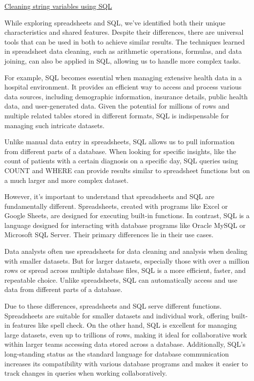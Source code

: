 \documentclass[]{article}
\begin{document}
\uline{Cleaning string variables using SQL}

While exploring spreadsheets and SQL, we've identified both their unique characteristics and shared features. Despite their differences, there are universal tools that can be used in both to achieve similar results. The techniques learned in spreadsheet data cleaning, such as arithmetic operations, formulas, and data joining, can also be applied in SQL, allowing us to handle more complex tasks.

For example, SQL becomes essential when managing extensive health data in a hospital environment. It provides an efficient way to access and process various data sources, including demographic information, insurance details, public health data, and user-generated data. Given the potential for millions of rows and multiple related tables stored in different formats, SQL is indispensable for managing such intricate datasets.

Unlike manual data entry in spreadsheets, SQL allows us to pull information from different parts of a database. When looking for specific insights, like the count of patients with a certain diagnosis on a specific day, SQL queries using COUNT and WHERE can provide results similar to spreadsheet functions but on a much larger and more complex dataset.

However, it's important to understand that spreadsheets and SQL are fundamentally different. Spreadsheets, created with programs like Excel or Google Sheets, are designed for executing built-in functions. In contrast, SQL is a language designed for interacting with database programs like Oracle MySQL or Microsoft SQL Server. Their primary differences lie in their use cases.

Data analysts often use spreadsheets for data cleaning and analysis when dealing with smaller datasets. But for larger datasets, especially those with over a million rows or spread across multiple database files, SQL is a more efficient, faster, and repeatable choice. Unlike spreadsheets, SQL can automatically access and use data from different parts of a database.

Due to these differences, spreadsheets and SQL serve different functions. Spreadsheets are suitable for smaller datasets and individual work, offering built-in features like spell check. On the other hand, SQL is excellent for managing large datasets, even up to trillions of rows, making it ideal for collaborative work within larger teams accessing data stored across a database. Additionally, SQL's long-standing status as the standard language for database communication increases its compatibility with various database programs and makes it easier to track changes in queries when working collaboratively.
\end{document}

